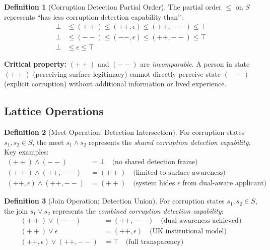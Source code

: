 \documentclass[11pt,a4paper]{article}
\theoremstyle{definition}
\newtheorem{definition}{Definition}
\begin{document}
\begin{definition}[Corruption Detection Partial Order]
The partial order $\leq$ on $S$ represents ``has less corruption detection capability than'':
\begin{align*}
\bot &\leq (++) \leq (++,\epsilon) \leq (++,--) \leq \top \\
\bot &\leq (--) \leq (--,\epsilon) \leq (++,--) \leq \top \\
\bot &\leq \epsilon \leq \top
\end{align*}

\textbf{Critical property:} $(++)$ and $(--)$ are \emph{incomparable}. A person in state $(++)$ (perceiving surface legitimacy) cannot directly perceive state $(--)$ (explicit corruption) without additional information or lived experience.
\end{definition}

\subsection{Lattice Operations}

\begin{definition}[Meet Operation: Detection Intersection]
For corruption states $s_1, s_2 \in S$, the meet $s_1 \wedge s_2$ represents the \emph{shared corruption detection capability}. Key examples:
\begin{align*}
(++) \wedge (--) &= \bot \quad \text{(no shared detection frame)} \\
(++) \wedge (++,--) &= (++) \quad \text{(limited to surface awareness)} \\
(++,\epsilon) \wedge (++,--) &= (++) \quad \text{(system hides } \epsilon \text{ from dual-aware applicant)}
\end{align*}
\end{definition}

\begin{definition}[Join Operation: Detection Union]
For corruption states $s_1, s_2 \in S$, the join $s_1 \vee s_2$ represents the \emph{combined corruption detection capability}:
\begin{align*}
(++) \vee (--) &= (++,--) \quad \text{(dual awareness achieved)} \\
(++) \vee \epsilon &= (++,\epsilon) \quad \text{(UK institutional model)} \\
(++,\epsilon) \vee (++,--) &= \top \quad \text{(full transparency)}
\end{align*}
\end{definition}
\end{document}
